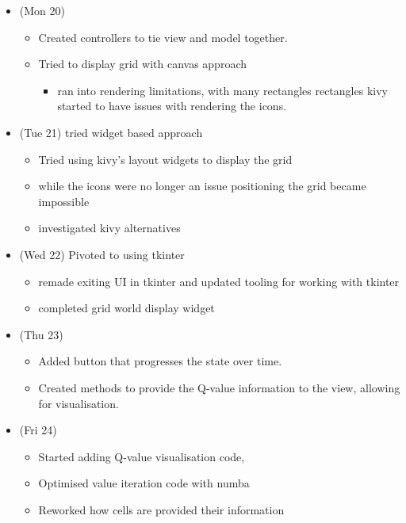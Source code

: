 \begin{itemize}
\tightlist
\item
  (Mon 20)

  \begin{itemize}
  \tightlist
  \item
    Created controllers to tie view and model together.
  \item
    Tried to display grid with canvas approach

    \begin{itemize}
    \tightlist
    \item
      ran into rendering limitations, with many rectangles rectangles
      kivy started to have issues with rendering the icons.
    \end{itemize}
  \end{itemize}
\item
  (Tue 21) tried widget based approach

  \begin{itemize}
  \tightlist
  \item
    Tried using kivy's layout widgets to display the grid
  \item
    while the icons were no longer an issue positioning the grid became
    impossible
  \item
    investigated kivy alternatives
  \end{itemize}
\item
  (Wed 22) Pivoted to using tkinter

  \begin{itemize}
  \tightlist
  \item
    remade exiting UI in tkinter and updated tooling for working with
    tkinter
  \item
    completed grid world display widget
  \end{itemize}
\item
  (Thu 23)

  \begin{itemize}
  \tightlist
  \item
    Added button that progresses the state over time.
  \item
    Created methods to provide the Q-value information to the view,
    allowing for visualisation.
  \end{itemize}
\item
  (Fri 24)

  \begin{itemize}
  \tightlist
  \item
    Started adding Q-value visualisation code,
  \item
    Optimised value iteration code with numba
  \item
    Reworked how cells are provided their information
  \end{itemize}
\end{itemize}

